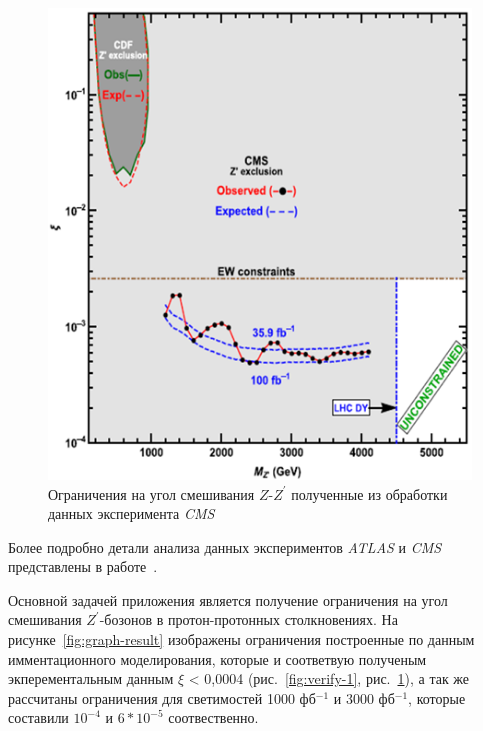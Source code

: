 \begin{figure}[!h]
	\centering
	\includegraphics[width=\textwidth]{figures/verify-2.png}
	\caption{Ограничения на угол смешивания $Z$-${Z}^{\prime}$ полученные из обработки данных эксперимента \textit{CMS}~\cite{2part-pankov}}
	\label{fig:verify-2}
\end{figure}

Более подробно детали анализа данных экспериментов \textit{ATLAS} и \textit{CMS} представлены в работе~\cite{2part-pankov}. 

Основной задачей приложения является получение ограничения на угол смешивания ${Z}^{\prime}$-бозонов в протон-протонных столкновениях. На рисунке~\ref{fig:graph-result} изображены ограничения построенные по данным имментационного моделирования, которые и соответвую полученым экперементальным данным $\xi$ < 0,0004 (рис.~\ref{fig:verify-1}, рис.~\ref{fig:verify-2}), а так же рассчитаны ограничения для светимостей 1000 фб${}^{−1}$ и 3000 фб${}^{−1}$, которые составили ${10}^{-4}$ и $6*{10}^{-5}$ соотвественно.



